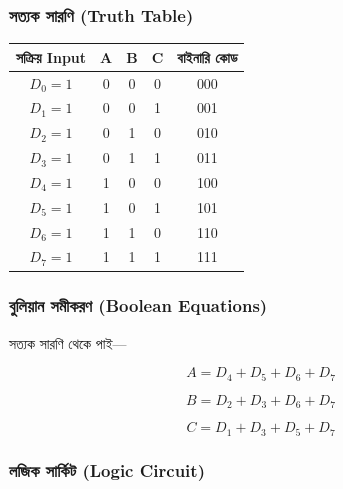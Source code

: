
\subsubsection*{সত্যক সারণি
(\textenglish{Truth Table})}

\begin{center}
\begin{tabular}{|c|c|c|c|c|}
\hline

\rowcolor{ICTLightBlue}
\textbf{সক্রিয় \textenglish{Input}} &
\(\mathbf{A}\) &
\(\mathbf{B}\) &
\(\mathbf{C}\) &
\textbf{বাইনারি কোড}
\\
\hline

\(D_0=1\)&0&0&0&000\\
\hline
\(D_1=1\)&0&0&1&001\\
\hline
\(D_2=1\)&0&1&0&010\\
\hline
\(D_3=1\)&0&1&1&011\\
\hline
\(D_4=1\)&1&0&0&100\\
\hline
\(D_5=1\)&1&0&1&101\\
\hline
\(D_6=1\)&1&1&0&110\\
\hline
\(D_7=1\)&1&1&1&111\\
\hline

\end{tabular}
\end{center}



\subsubsection*{বুলিয়ান সমীকরণ
(\textenglish{Boolean Equations})}

সত্যক সারণি থেকে পাই—

\[
\boxed{
A=D_4+D_5+D_6+D_7
}
\]

\[
\boxed{
B=D_2+D_3+D_6+D_7
}
\]

\[
\boxed{
C=D_1+D_3+D_5+D_7
}
\]



\subsubsection*{লজিক সার্কিট
(\textenglish{Logic Circuit})}

